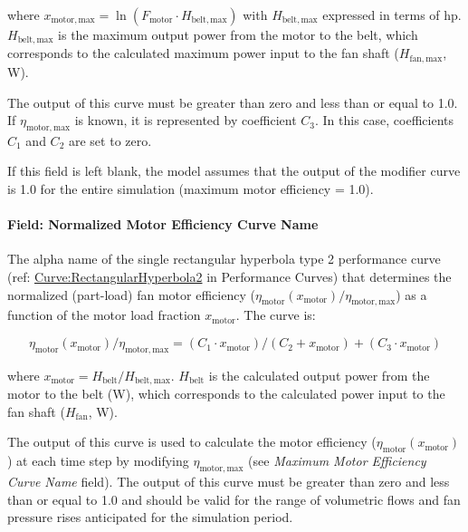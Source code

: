 where \(x_{\mathrm{motor, max}} = \ln(F_{\mathrm{motor}} \cdot H_{\mathrm{belt, max}})\) with \(H_{\mathrm{belt, max}}\) expressed in terms of hp. \(H_{\mathrm{belt, max}}\) is the maximum output power from the motor to the belt, which corresponds to the calculated maximum power input to the fan shaft (\(H_{\mathrm{fan, max}}\), W).

The output of this curve must be greater than zero and less than or equal to 1.0. If \(\eta_{\mathrm{motor, max}}\) is known, it is represented by coefficient \(C_3\). In this case, coefficients \(C_1\) and \(C_2\) are set to zero.

If this field is left blank, the model assumes that the output of the modifier curve is 1.0 for the entire simulation (maximum motor efficiency = 1.0).

\paragraph{Field: Normalized Motor Efficiency Curve Name}\label{field-normalized-motor-efficiency-curve-name}

The alpha name of the single rectangular hyperbola type 2 performance curve (ref: \hyperref[curverectangularhyperbola2]{Curve:RectangularHyperbola2} in Performance Curves) that determines the normalized (part-load) fan motor efficiency (\(\eta_{\mathrm{motor}} (x_{\mathrm{motor}}) /  \eta_{\mathrm{motor, max}}\)) as a function of the motor load fraction \(x_{\mathrm{motor}}\). The curve is:

\begin{equation}
  \eta_{\mathrm{motor}} (x_{\mathrm{motor}}) / \eta_{\mathrm{motor, max}} = (C_1 \cdot x_{\mathrm{motor}}) / (C_2 + x_{\mathrm{motor}}) + (C_3 \cdot x_{\mathrm{motor}})
\end{equation}

where \(x_{\mathrm{motor}} = H_{\mathrm{belt}} / H_{\mathrm{belt, max}}\). \(H_{\mathrm{belt}}\) is the calculated output power from the motor to the belt (W), which corresponds to the calculated power input to the fan shaft (\(H_{\mathrm{fan}}\), W).

  The output of this curve is used to calculate the motor efficiency (\(\eta_{\mathrm{motor}} (x_{\mathrm{motor}})\)) at each time step by modifying \(\eta_{\mathrm{motor, max}}\) (see \emph{Maximum Motor Efficiency Curve Name} field). The output of this curve must be greater than zero and less than or equal to 1.0 and should be valid for the range of volumetric flows and fan pressure rises anticipated for the simulation period.

